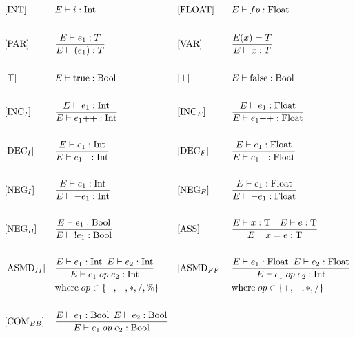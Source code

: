 \begin{align*}
&[\text{INT}]           &  &E \vdash i : \text{Int} & 
&[\text{FLOAT}]           &  &E \vdash fp : \text{Float}\\\\
%
&[\text{PAR}]           &  &\frac{E \vdash e_1 : T}{E \vdash (e_1) : T} & 
&[\text{VAR}]           &  &\frac{E(x) = T}{E \vdash x : T}\\\\
%
&[\top]           &  &E \vdash \text{true} : \text{Bool} & 
&[\bot]           &  &E \vdash \text{false} : \text{Bool}\\\\
%
&[\text{INC}_I]           &  &\frac{E \vdash e_1 : \text{Int}}{E \vdash e_1\text{++} : \text{Int}} & 
&[\text{INC}_F]           &  &\frac{E \vdash e_1 : \text{Float}}{E \vdash e_1\text{++} : \text{Float}}\\\\
%
&[\text{DEC}_I]           &  &\frac{E \vdash e_1 : \text{Int}}{E \vdash e_1\text{-\medskip-} : \text{Int}} & 
&[\text{DEC}_F]           &  &\frac{E \vdash e_1 : \text{Float}}{E \vdash e_1\text{-\medskip-} : \text{Float}}\\\\
%
&[\text{NEG}_I]           &  &\frac{E \vdash e_1 : \text{Int}}{E \vdash -e_1 : \text{Int}} & 
&[\text{NEG}_F]           &  &\frac{E \vdash e_1 : \text{Float}}{E \vdash -e_1 : \text{Float}}\\\\
%
&[\text{NEG}_B]           &  &\frac{E \vdash e_1 : \text{Bool}}{E \vdash\; !\smallskip e_1 : \text{Bool}} &
&[\text{ASS}]           &  &\frac{E \vdash x : \text{T}\quad E \vdash e : \text{T}}{E \vdash x = e : \text{T}}\\\\
%
&[\text{ASMD}_{II}]           &  &\frac{E \vdash e_1 : \text{Int} \enskip E \vdash e_2 : \text{Int}}{E \vdash e_1\; op \;e_2 : \text{Int}} & &[\text{ASMD}_{FF}]           &  &\frac{E \vdash e_1 : \text{Float} \enskip E \vdash e_2 : \text{Float}}{E \vdash e_1\; op \;e_2 : \text{Int}}\\    
& & &\text{where}\; op \in \{+, -, *, /, \%\} & & & &\text{where}\; op \in \{+, -, *, /\}\\\\
%
&[\text{COM}_{BB}]           &  &\frac{E \vdash e_1 : \text{Bool} \enskip E \vdash e_2 : \text{Bool}}{E \vdash e_1\; op \;e_2 : \text{Bool}}\\

\end{align*}
